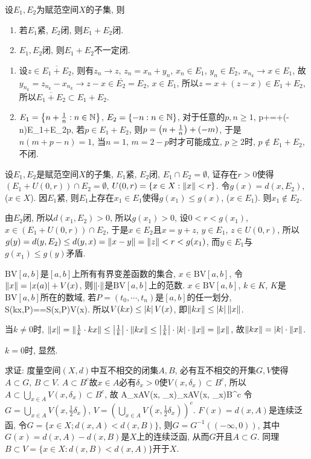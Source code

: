 \bq{}{}
设$E_1, E_2$为赋范空间$X$的子集, 则
\begin{enumerate}[(1)]
 \item 若$E_1$紧, $E_2$闭, 则$E_1+E_2$闭.
 \item $E_1, E_2$闭, 则$E_1+E_2$不一定闭.
\end{enumerate}
\eq
\ba
\begin{enumerate}[(1)]
 \item 设$z\in\overline{E_1+E_2}$, 则有$z_n\to z$, $z_{n}=x_n+y_n$, $x_n\in E_1$, $y_n\in E_2$, $x_{n_{k}}\to x\in E_1$,
 故$y_{n_{k}}=z_{n_k}-x_{n_k}\to z-x\in\overline{E_2}=E_2$, $x\in E_1$, 所以$z=x+(z-x)\in E_1+E_2$, 
 所以$\overline{E_1+E_2}\subset E_1+E_2$.
 \item $E_1=\left\{n+\frac1n: n\in\mathbb{N}\right\}$, $E_2=\{-n: n\in \mathbb{N}\}$, 对于任意的$p, n\ge1$, 
 \bee
 p+=+(-n)\in E_1+E_2\Longrightarrow p\in {}, 
 \eee
 若$p\in E_1+E_2$, 则$p=\left(n+\frac1n\right)+(-m)$, 于是$n(m+p-n)=1$, 当$n=1$, $m=2-p$时才可能成立, $p\ge2$时, $p\not\in E_1+E_2$, 不闭.
\end{enumerate}
\ea

\bq{}{}
设$E_1, E_2$是赋范空间$X$的子集, $E_1$紧, $E_2$闭, $E_1\cap E_2=\emptyset$, 证存在$r>0$使得$(E_1+U(0,r))\cap E_2=\emptyset$, 
$U(0,r)=\{x\in X: \lVert x\rVert<r\}$.
\eq
\ba
令$g(x)=d(x,E_2)$, ($x\in X$). 因$E_1$紧, 则$E_1$上存在$x_1\in E_1$使得$g(x_1)\le g(x)$, ($x\in E_1$). 则$x_1\not\in E_2$.

由$E_2$闭, 所以$d(x_1, E_2)>0$, 所以$g(x_1)>0$, 设$0<r<g(x_1)$, $x\in (E_1+U(0,r))\cap E_2$, 于是$x\in E_2$且$x=y+z$,
$y\in E_1$, $z\in U(0,r)$, 所以$g(y)=d(y,E_2)\le d(y,x)=\lVert x-y\rVert=\lVert z\rVert<r<g(x_1)$, 而$y\in E_1$与$g(x_1)\le g(y)$矛盾.
\ea

\bq{}{}
$\mathrm{BV}[a,b]$是$[a,b]$上所有有界变差函数的集合, $x\in \mathrm{BV}[a,b]$, 令$\lVert x\rVert=\left\lvert x(a)\right\rvert+V(x)$, 
则$\lVert\cdot\rVert$是$\mathrm{BV}[a,b]$上的范数.
\eq
\ba
$x\in\mathrm{BV}[a,b]$, $k\in K$, $K$是$\mathrm{BV}[a,b]$所在的数域, 若$P=(t_0, \cdots, t_n)$是$[a,b]$的任一划分,
\bee
S(kx,P)=\sum{}=\cdot S(x,P)\le{}\cdot V(x).
\eee
所以$V(kx)\le\left\lvert k\right\rvert V(x)$, 即$\lVert kx\rVert\le \left\lvert k\right\rvert\lVert x\rVert$.

当$k\ne0$时, $\lVert x\rVert=\lVert\frac1k\cdot kx\rVert\le\left\lvert\frac1k\right\rvert\cdot\lVert kx\rVert\le\left\lvert\frac1k\right\rvert\cdot\left\lvert k\right\rvert\cdot\lVert x\rVert=\lVert x\rVert$, 
故$\lVert kx\rVert=\left\lvert k\right\rvert\cdot\lVert x\rVert$.

$k=0$时, 显然.
\ea

\bq{}{}
求证: 度量空间$(X,d)$中互不相交的闭集$A,B$, 必有互不相交的开集$G, V$使得$A\subset G$, $B\subset V$.
\eq
\ba
$A\subset B^c$故$x\in A$必有$\delta_x>0$使$V(x, \delta_x)\subset B^c$, 所以$A\subset\bigcup_{x\in A}V(x, \delta_x)\subset B^c$, 故
\bee
A\subset\bigcup_{x\in A}V(x, \delta_x)\subset{}\subset\bigcup_{x\in A}V(x, \delta_x)\subset B^c
\eee
令$G=\bigcup_{x\in A}V(x,\frac12\delta_x)$, $V=\left(\bigcup_{x\in A}V(x,\frac12\delta_x)\right)^c$.
\ea
\ba
$F(x)=d(x, A)$是连续泛函, 令$G=\{x\in X; d(x, A)< d(x,B)\}$, 则$G=G^{-1}((-\infty,0))$, 其中$G(x)=d(x, A)-d(x, B)$是$X$上的连续泛函, 从而$G$开且$A\subset G$.
同理$B\subset V=\{x\in X: d(x, B)< d(x, A)\}$开于$X$.
\ea


